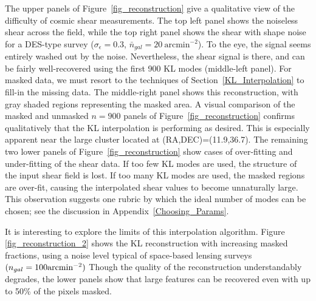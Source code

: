 \documentclass[twocolumn]{emulateapj}
\begin{document}
The upper panels of Figure~\ref{fig_reconstruction} give a qualitative view
of the difficulty of cosmic shear measurements.  The top left panel shows the
noiseless shear across the field, while the top right panel shows the
shear with shape noise for a DES-type survey ($\sigma_\epsilon=0.3$, 
$\bar{n}_{gal} = 20\ \mathrm{arcmin}^{-2}$).  To the eye, the signal seems
entirely washed out by the noise.  Nevertheless, the shear signal is there,
and can be fairly well-recovered using the first 900 KL modes 
(middle-left panel). For masked data, we must resort to the 
techniques of Section~\ref{KL_Interpolation} to fill-in the missing data.
The middle-right panel shows this reconstruction, with gray shaded
regions representing the masked area.  A visual comparison of the masked 
and unmasked $n=900$ panels of Figure~\ref{fig_reconstruction} confirms
qualitatively that the KL interpolation is performing as desired.  This is
especially apparent near the large cluster located at (RA,DEC)=(11.9,36.7).  
The remaining two lower panels of Figure~\ref{fig_reconstruction} 
show cases of over-fitting and under-fitting
of the shear data. If too few KL modes are used, the structure of the input 
shear field is lost.  If too many KL modes are used, the masked regions 
are over-fit,
causing the interpolated shear values to become unnaturally large.  This
observation suggests one rubric by which the ideal number of modes can be
chosen; see the discussion in Appendix~\ref{Choosing_Params}.

It is interesting to explore the limits of this interpolation algorithm.
Figure \ref{fig_reconstruction_2} shows the KL reconstruction with
increasing masked fractions, using a noise level typical of space-based
lensing surveys $(n_{gal}=100{\rm arcmin}^{-2})$  Though the quality of
the reconstruction understandably degrades, the lower panels show that
large features can be recovered even with up to 50\% of the pixels masked.

\end{document}
